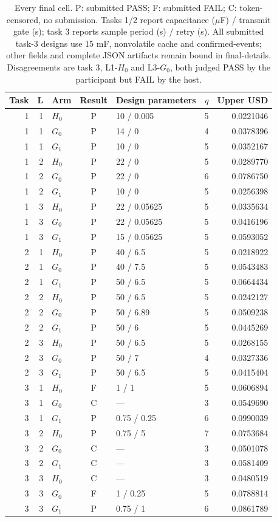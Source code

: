 \begin{table}[htbp]
\centering
\footnotesize
\begin{tabular}{rrlclrr}
\toprule
Task & L & Arm & Result & Design parameters & $q$ & Upper USD \\
\midrule
1 & 1 & $H_0$ & P & 10 / 0.005 & 5 & 0.0221046 \\
1 & 1 & $G_0$ & P & 14 / 0 & 4 & 0.0378396 \\
1 & 1 & $G_1$ & P & 10 / 0 & 5 & 0.0352167 \\
1 & 2 & $H_0$ & P & 22 / 0 & 5 & 0.0289770 \\
1 & 2 & $G_0$ & P & 22 / 0 & 6 & 0.0786750 \\
1 & 2 & $G_1$ & P & 10 / 0 & 5 & 0.0256398 \\
1 & 3 & $H_0$ & P & 22 / 0.05625 & 5 & 0.0335634 \\
1 & 3 & $G_0$ & P & 22 / 0.05625 & 5 & 0.0416196 \\
1 & 3 & $G_1$ & P & 15 / 0.05625 & 5 & 0.0593052 \\
2 & 1 & $H_0$ & P & 40 / 6.5 & 5 & 0.0218922 \\
2 & 1 & $G_0$ & P & 40 / 7.5 & 5 & 0.0543483 \\
2 & 1 & $G_1$ & P & 50 / 6.5 & 5 & 0.0664434 \\
2 & 2 & $H_0$ & P & 50 / 6.5 & 5 & 0.0242127 \\
2 & 2 & $G_0$ & P & 50 / 6.89 & 5 & 0.0509238 \\
2 & 2 & $G_1$ & P & 50 / 6 & 5 & 0.0445269 \\
2 & 3 & $H_0$ & P & 50 / 6.5 & 5 & 0.0268155 \\
2 & 3 & $G_0$ & P & 50 / 7 & 4 & 0.0327336 \\
2 & 3 & $G_1$ & P & 50 / 6.5 & 5 & 0.0415404 \\
3 & 1 & $H_0$ & F & 1 / 1 & 5 & 0.0606894 \\
3 & 1 & $G_0$ & C & --- & 3 & 0.0549690 \\
3 & 1 & $G_1$ & P & 0.75 / 0.25 & 6 & 0.0990039 \\
3 & 2 & $H_0$ & P & 0.75 / 5 & 7 & 0.0753684 \\
3 & 2 & $G_0$ & C & --- & 3 & 0.0501078 \\
3 & 2 & $G_1$ & C & --- & 3 & 0.0581409 \\
3 & 3 & $H_0$ & C & --- & 3 & 0.0480519 \\
3 & 3 & $G_0$ & F & 1 / 0.25 & 5 & 0.0788814 \\
3 & 3 & $G_1$ & P & 0.75 / 1 & 6 & 0.0861789 \\
\bottomrule
\end{tabular}
\caption{Every final cell. P: submitted PASS; F: submitted FAIL; C: token-censored, no submission. Tasks 1/2 report capacitance ($\mu$F) / transmit gate (s); task 3 reports sample period (s) / retry (s). All submitted task-3 designs use 15 mF, nonvolatile cache and confirmed-events; other fields and complete JSON artifacts remain bound in final-details. Disagreements are task 3, L1-$H_0$ and L3-$G_0$, both judged PASS by the participant but FAIL by the host.}
\label{tab:final-cells}
\end{table}
\FloatBarrier
